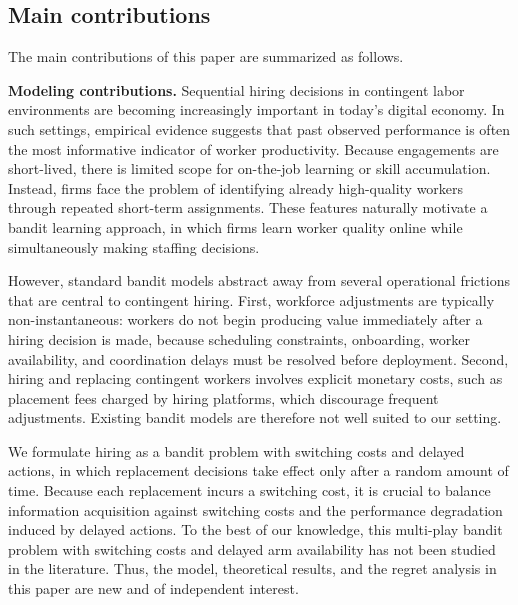 \documentclass[opre,blindrev]{informs3}
\begin{document}
\vspace{-.1in}

\subsection{Main contributions}
The main contributions of this paper are summarized as follows.

{\bf Modeling contributions.}
Sequential hiring decisions in contingent labor environments are becoming increasingly important in today’s digital economy. In such settings, empirical evidence suggests that past observed performance is often the most informative indicator of worker productivity. Because engagements are short-lived, there is limited scope for on-the-job learning or skill accumulation. Instead, firms face the problem of identifying already high-quality workers through repeated short-term assignments. These features naturally motivate a bandit learning approach, in which firms learn worker quality online while simultaneously making staffing decisions.

However, standard bandit models abstract away from several operational frictions that are central to contingent hiring. First, workforce adjustments are typically non-instantaneous: workers do not begin producing value immediately after a hiring decision is made, because scheduling constraints, onboarding, worker availability, and coordination delays must be resolved before deployment. Second, hiring and replacing contingent workers involves explicit monetary costs, such as placement fees charged by hiring platforms, which discourage frequent adjustments. Existing bandit models are therefore not well suited to our setting.

We formulate hiring as a bandit problem with switching costs and delayed actions, in which replacement decisions take effect only after a random amount of time. Because each replacement incurs a switching cost, it is crucial to balance 
information acquisition against switching costs and the performance degradation induced by delayed actions. To the best of our knowledge, this multi-play bandit problem with switching costs and delayed arm availability has not been studied in the literature. Thus, the model, theoretical results, and the regret analysis in this paper are new and of independent interest.

\end{document}

